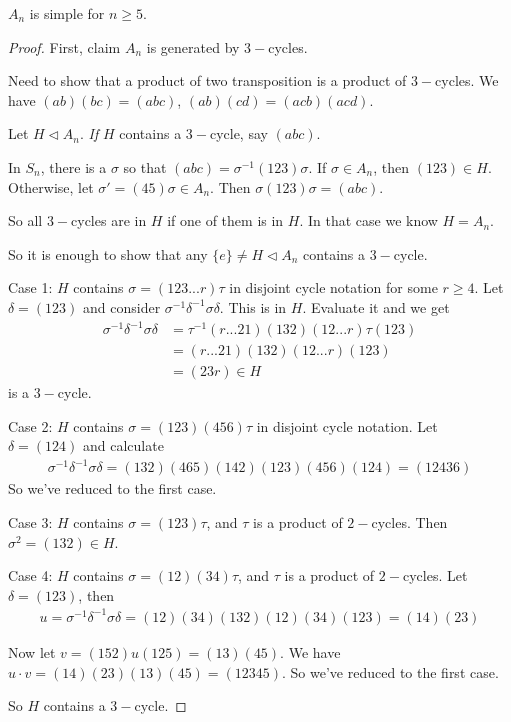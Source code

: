 \documentclass[a4paper]{article}
\begin{document}
\begin{thm}
$A_n$ is simple for $n \geq 5$.
\begin{proof}
First, claim $A_n$ is generated by $3-$cycles.

Need to show that a product of two transposition is a product of $3-$cycles. We have $(ab)(bc)=(abc)$, $(ab)(cd) = (acb)(acd)$.

Let $H \triangleleft A_n$. \emph{If} $H$ contains a $3-$cycle, say $(abc)$.

In $S_n$, there is a $\sigma$ so that $(abc) = \sigma^{-1} (123) \sigma$. If $\sigma \in A_n$, then $(123) \in H$. Otherwise, let $\sigma' = (45) \sigma \in A_n$. Then $\sigma(123)\sigma = (abc)$.

So all $3-$cycles are in $H$ if one of them is in $H$. In that case we know $H = A_n$.

So it is enough to show that any $\{e\} \neq H \triangleleft A_n$ contains a $3-$cycle.

Case 1: $H$ contains $\sigma = (123...r)\tau$ in disjoint cycle notation for some $r \geq 4$. Let $\delta = (123)$ and consider $\sigma^{-1}\delta^{-1}\sigma\delta$. This is in $H$. Evaluate it and we get
\begin{equation*}
\begin{aligned}
\sigma^{-1}\delta^{-1}\sigma\delta &= \tau^{-1}(r...21)(132)(12...r)\tau(123)\\
&=(r...21)(132)(12...r)(123)\\
&=(23r) \in H
\end{aligned}
\end{equation*}
is a $3-$cycle. 

Case 2: $H$ contains $\sigma = (123)(456)\tau$ in disjoint cycle notation. Let $\delta = (124)$ and calculate
\begin{equation*}
\begin{aligned}
\sigma^{-1}\delta^{-1}\sigma\delta = (132)(465)(142)(123)(456)(124) = (12436)
\end{aligned}
\end{equation*}
So we've reduced to the first case.

Case 3: $H$ contains $\sigma = (123) \tau$, and $\tau$ is a product of $2-$cycles. Then $\sigma^2 = (132) \in H$.

Case 4: $H$ contains $\sigma = (12)(34)\tau$, and $\tau$ is a product of $2-$cycles. Let $\delta = (123)$, then
\begin{equation*}
\begin{aligned}
u=\sigma^{-1}\delta^{-1}\sigma\delta=(12)(34)(132)(12)(34)(123)=(14)(23)
\end{aligned}
\end{equation*}

Now let $v=(152)u(125) = (13)(45)$. We have $u\cdot v = (14)(23)(13)(45) = (12345)$. So we've reduced to the first case.

So $H$ contains a $3-$cycle.

\end{proof}
\end{thm}
\end{document}
